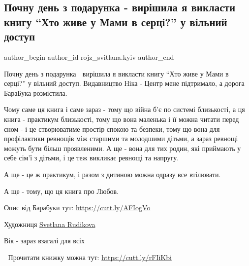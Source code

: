  
 
 
 
 

\subsection{Почну день з подарунка - вирішила я викласти книгу \enquote{Хто живе у Мами в серці?} у вільний доступ}
\label{sec:14_04_2022.fb.rojz_svitlana.kyiv.1.pochnu_den_z_podarun}

\ifcmt
 author_begin
   author_id rojz_svitlana.kyiv
 author_end
\fi

Почну день з подарунка 🙂 вирішила я викласти книгу \enquote{Хто живе у Мами в серці?}
у вільний доступ. Видавництво Ніка - Центр мене підтримало, а дорога БараБука
розмістила.

Чому саме ця книга і саме зараз - тому що війна б'є по системі близькості, а
ця книга - практикум близькості,  тому що вона маленька і її можна читати перед
сном - і це створюватиме простір спокою та безпеки, тому що вона для
профілактики ревнощів між старшими та молодшими дітьми, а зараз ревнощі можуть
бути більш проявленими. А ще - вона для тих родин, які приймають у себе сім'ї з
дітьми, і це теж викликає ревнощі та напругу. 

А ще - це ж практикум, і разом з дитиною можна одразу все втілювати. 

А ще - тому, що ця книга про Любов. 

Опис від Барабуки тут: \underline{https://cutt.ly/AFIogVo}

Художниця \href{https://www.facebook.com/svetlana.rudikova}{Svetlana Rudikova}

Вік - зараз взагалі для всіх 

📕 Прочитати книжку можна тут: \url{https://cutt.ly/rFIiKbi}

